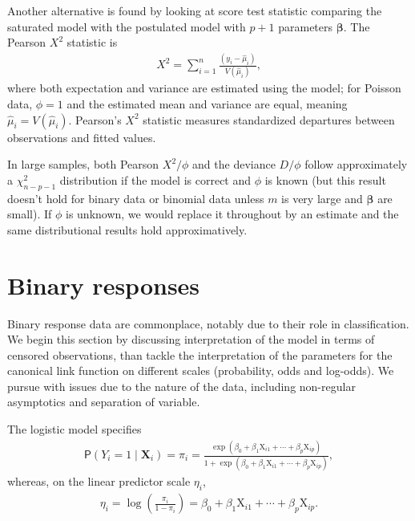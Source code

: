 \documentclass[
  11pt,
  letterpaper,
]{book}
\theoremstyle{definition}
\theoremstyle{definition}
\theoremstyle{definition}
\theoremstyle{definition}
\theoremstyle{remark}
\begin{document}
Another alternative is found by looking at score test statistic
comparing the saturated model with the postulated model with \(p+1\)
parameters \(\boldsymbol{\beta}\). The Pearson \(X^2\) statistic is
\begin{align*}
 X^2= \sum_{i=1}^n \frac{(y_i-\widehat{\mu}_i)}{ V(\widehat{\mu}_i)},
\end{align*}
where both expectation and variance are estimated using the
model; for Poisson data, \(\phi=1\) and the estimated mean and variance
are equal, meaning \(\widehat{\mu}_i=V(\widehat{\mu}_i)\). Pearson's \(X^2\)
statistic measures standardized departures between observations and
fitted values.

In large samples, both Pearson \(X^2/\phi\) and the deviance \(D/\phi\)
follow approximately a \(\chi^2_{n-p-1}\) distribution if the model is
correct and \(\phi\) is known (but this result doesn't hold for binary
data or binomial data unless \(m\) is very large and \(\boldsymbol{\beta}\)
are small). If \(\phi\) is unknown, we would replace it throughout by an
estimate and the same distributional results hold approximatively.

\hypertarget{binary-responses}{%
\section{Binary responses}\label{binary-responses}}

Binary response data are commonplace, notably due to their role in
classification. We begin this section by discussing interpretation of
the model in terms of censored observations, than tackle the
interpretation of the parameters for the canonical link function on
different scales (probability, odds and log-odds). We pursue with issues
due to the nature of the data, including non-regular asymptotics and
separation of variable.

The logistic model specifies
\begin{align*}
\mathsf{P}(Y_i=1 \mid \mathbf{X}_i) = \pi_i = \frac{\exp(\beta_0 + \beta_1 \mathrm{X}_{i1}+ \cdots + \beta_p\mathrm{X}_{ip})}{1 + \exp(\beta_0 + \beta_1 \mathrm{X}_{i1}+ \cdots + \beta_p\mathrm{X}_{ip})},
\end{align*}
whereas, on the linear predictor scale \(\eta_i\),
\begin{align*}
\eta_i =\log \left(\frac{\pi_i}{1-\pi_i}\right) =  \beta_0 + \beta_1 \mathrm{X}_{i1}+ \cdots + \beta_p\mathrm{X}_{ip}.
\end{align*}
\end{document}
